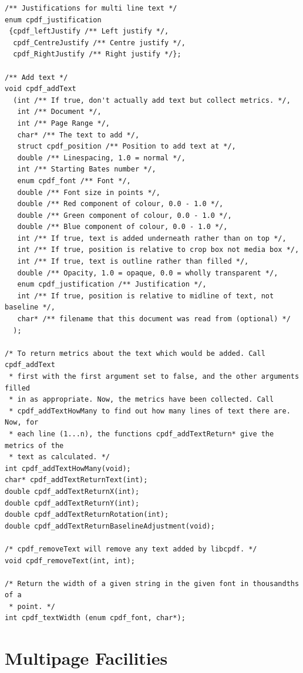 \documentclass[a4paper]{memoir}
\begin{document}
\begin{small}
\begin{lstlisting}
/** Justifications for multi line text */
enum cpdf_justification
 {cpdf_leftJustify /** Left justify */,
  cpdf_CentreJustify /** Centre justify */,
  cpdf_RightJustify /** Right justify */};

/** Add text */
void cpdf_addText
  (int /** If true, don't actually add text but collect metrics. */,
   int /** Document */,
   int /** Page Range */,
   char* /** The text to add */,
   struct cpdf_position /** Position to add text at */,
   double /** Linespacing, 1.0 = normal */,
   int /** Starting Bates number */,
   enum cpdf_font /** Font */,
   double /** Font size in points */,
   double /** Red component of colour, 0.0 - 1.0 */,
   double /** Green component of colour, 0.0 - 1.0 */,
   double /** Blue component of colour, 0.0 - 1.0 */,
   int /** If true, text is added underneath rather than on top */,
   int /** If true, position is relative to crop box not media box */,
   int /** If true, text is outline rather than filled */,
   double /** Opacity, 1.0 = opaque, 0.0 = wholly transparent */,
   enum cpdf_justification /** Justification */,
   int /** If true, position is relative to midline of text, not baseline */,
   char* /** filename that this document was read from (optional) */
  );

/* To return metrics about the text which would be added. Call cpdf_addText
 * first with the first argument set to false, and the other arguments filled
 * in as appropriate. Now, the metrics have been collected. Call
 * cpdf_addTextHowMany to find out how many lines of text there are. Now, for
 * each line (1...n), the functions cpdf_addTextReturn* give the metrics of the
 * text as calculated. */
int cpdf_addTextHowMany(void);
char* cpdf_addTextReturnText(int);
double cpdf_addTextReturnX(int);
double cpdf_addTextReturnY(int);
double cpdf_addTextReturnRotation(int);
double cpdf_addTextReturnBaselineAdjustment(void);

/* cpdf_removeText will remove any text added by libcpdf. */
void cpdf_removeText(int, int);

/* Return the width of a given string in the given font in thousandths of a
 * point. */
int cpdf_textWidth (enum cpdf_font, char*);
\end{lstlisting}
\end{small}

\chapter{Multipage Facilities}
\end{document}
